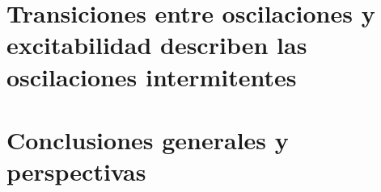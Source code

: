 \documentclass[graybox,envcountchap,sectrefs]{svmono}
\begin{document}
%


\chapter{Transiciones entre oscilaciones y excitabilidad describen las oscilaciones intermitentes}
\label{ch7}


\chapter{Conclusiones generales y perspectivas}

\label{ch8}

\appendix




\backmatter%

\cleardoublepage
{}
\printbibliography
\end{document}

